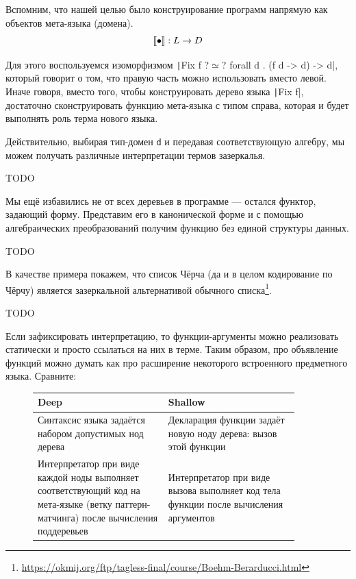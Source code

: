 Вспомним, что нашей целью было конструирование программ напрямую как объектов мета-языка (домена).
\[
    \llbracket{\bullet}\rrbracket : L \to D
\]

Для этого воспользуемся изоморфизмом
\texttt|Fix f ?$\simeq$? forall d . (f d -> d) -> d|, который говорит о том, что правую часть можно использовать вместо левой.
Иначе говоря, вместо того, чтобы конструировать дерево языка \texttt|Fix f|, достаточно сконструировать функцию мета-языка с типом справа, которая и будет выполнять роль терма нового языка.

Действительно, выбирая тип-домен \texttt{d} и передавая соответствующую алгебру, мы можем получать различные интерпретации термов зазеркалья.

TODO %

Мы ещё избавились не от всех деревьев в программе --- остался функтор, задающий форму.
Представим его в канонической форме и с помощью алгебраических преобразований получим функцию без единой структуры данных.

TODO %

В качестве примера покажем, что список Чёрча (да и в целом кодирование по Чёрчу) является зазеркальной альтернативой обычного списка\footnote{\url{https://okmij.org/ftp/tagless-final/course/Boehm-Berarducci.html}}.

TODO %


Если зафиксировать интерпретацию, то функции-аргументы можно реализовать статически и просто ссылаться на них в терме.
Таким образом, про объявление функций можно думать как про расширение некоторого встроенного предметного языка.
Сравните:
\begin{figure}[h]
    \centering
    \begin{tabular}{|p{0.45\linewidth}|p{0.45\linewidth}|}
        \hline
        Deep                                                                                                                                 & Shallow                                                                              \\
        \hline
        Синтаксис языка задаётся набором допустимых нод дерева                                                                               & Декларация функции задаёт новую ноду дерева: вызов этой функции                      \\
        \hline
        Интерпретатор при виде каждой ноды выполняет соответствующий код на мета-языке (ветку паттерн-матчинга) после вычисления поддеревьев & Интерпретатор при виде вызова выполняет код тела функции после вычисления аргументов \\
        \hline
    \end{tabular}
\end{figure}

